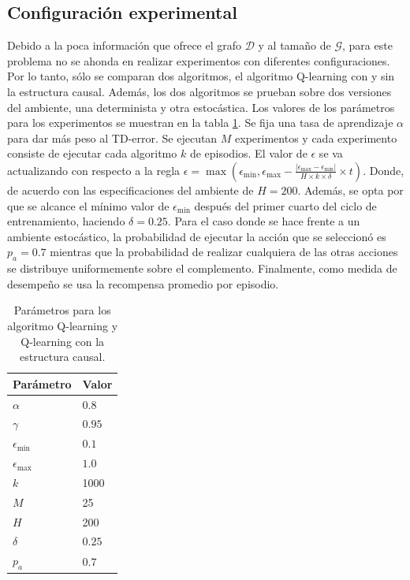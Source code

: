\subsection{Configuración experimental}

Debido a la poca información que ofrece el grafo $\mathcal{D}$ y al tamaño de $\mathcal{G}$, para este problema no se ahonda en realizar experimentos con diferentes configuraciones. Por lo
tanto, sólo se comparan dos algoritmos,
el algoritmo Q-learning con y sin la estructura causal.
Además, los dos algoritmos se prueban sobre dos versiones del ambiente, una determinista
y otra estocástica. Los valores de los parámetros para los experimentos se muestran en la tabla \ref{tab:tax-params}. Se fija una tasa de aprendizaje $\alpha$ para dar más peso al TD-error. Se ejecutan $M$ experimentos y cada experimento consiste de ejecutar cada algoritmo $k$ de episodios.  El valor de $\epsilon$  se va actualizando con respecto a la regla $\epsilon = \max(\epsilon_{\min}, \epsilon_{\max} - \frac{|\epsilon_{\max} - \epsilon_{\min}|}{H \times k \times \delta} \times t)$. Donde, de acuerdo con las especificaciones del ambiente de \cite{gym2016brockman} $H = 200$. Además, se opta por que se alcance el mínimo valor de $\epsilon_{\min}$ después del primer cuarto del ciclo de entrenamiento, haciendo $\delta = 0.25$. Para el caso donde se hace frente a un ambiente estocástico, la probabilidad de ejecutar la acción que se seleccionó es $p_a = 0.7$ mientras que la probabilidad de realizar cualquiera de las otras acciones se distribuye uniformemente sobre el complemento. Finalmente, como medida
de desempeño se usa la recompensa promedio por episodio.

\begin{table}[h]
\centering
\caption{Parámetros para los algoritmo Q-learning y Q-learning con la estructura causal.}
\label{tab:tax-params}
\begin{tabular}{ll}
\hline
Parámetro                                                                                      & Valor    \\ \hline
$\alpha$                                                                                       & $0.8$      \\
$\gamma$                                                                                       & $0.95$     \\
$\epsilon_{\min}$                                                                              & $0.1$     \\
$\epsilon_{\max}$                                                                              & $1.0$      \\
$k$                                                                                            & 1000     \\
$M$                                                                                            & 25       \\
$H$ & 200\\
$\delta$ & $0.25$\\
$p_a$ & $0.7$      \\ \hline
\end{tabular}
\end{table}

